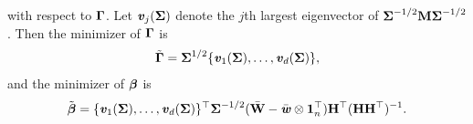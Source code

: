 \documentclass[12pt]{article}
\def \bfitv{\mbox{\textbf{\textit{v}}}}
\def \bfitw{\mbox{\textbf{\textit{w}}}}
\def \bfbeta{\mbox{\boldmath $\beta$}}
\def \M{\mathbf{M}}
\def \H{\mathbf{H}}
\def \W{\mathbf{W}}
\def \bfGamma{\mbox{\boldmath $\Gamma$}}
\def \bfSigma{\mbox{\boldmath $\Sigma$}}
\begin{document}
with respect to $\bfGamma$. Let $\bfitv_j(\bfSigma)$ denote the $j$th largest eigenvector of $\bfSigma^{-1/2} \M \bfSigma^{-1/2}$. Then the minimizer of $\bfGamma$ is
\begin{eqnarray*}
\tilde{\bfGamma} = \bfSigma^{1/2} \{\bfitv_1(\bfSigma), \ldots, \bfitv_d(\bfSigma)\},
\end{eqnarray*}
and the minimizer of $\bfbeta$ is
\begin{eqnarray*}
\tilde{\bfbeta} %
= \{\bfitv_1(\bfSigma), \ldots, \bfitv_d(\bfSigma)\}^{\top} \bfSigma^{-1/2} (\bar{\W} - \bar{\bfitw} \otimes {\bf 1}_n^{\top}) \H^{\top} (\H\H^{\top})^{-1}.
\end{eqnarray*}



\end{document}
